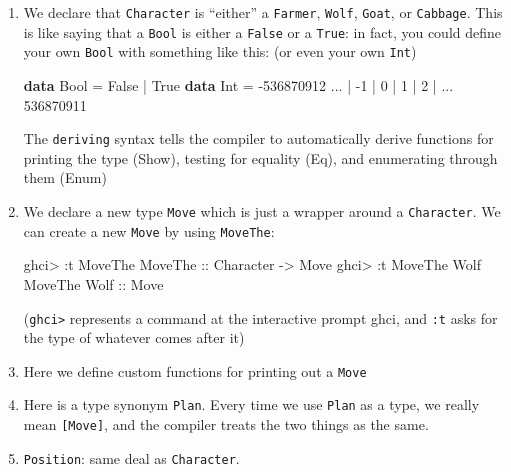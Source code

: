 \documentclass[]{article}
\newenvironment{Shaded}{}{}
\newcommand{\KeywordTok}[1]{\textcolor[rgb]{0.00,0.44,0.13}{\textbf{{#1}}}}
\newcommand{\DataTypeTok}[1]{\textcolor[rgb]{0.56,0.13,0.00}{{#1}}}
\newcommand{\DecValTok}[1]{\textcolor[rgb]{0.25,0.63,0.44}{{#1}}}
\newcommand{\OtherTok}[1]{\textcolor[rgb]{0.00,0.44,0.13}{{#1}}}
\newcommand{\FunctionTok}[1]{\textcolor[rgb]{0.02,0.16,0.49}{{#1}}}
\newcommand{\NormalTok}[1]{{#1}}
\begin{document}
\begin{enumerate}
\def\labelenumi{\arabic{enumi}.}
\item
  We declare that \texttt{Character} is ``either'' a \texttt{Farmer},
  \texttt{Wolf}, \texttt{Goat}, or \texttt{Cabbage}. This is like saying that a
  \texttt{Bool} is either a \texttt{False} or a \texttt{True}: in fact, you
  could define your own \texttt{Bool} with something like this: (or even your
  own \texttt{Int})

\begin{Shaded}
\begin{Highlighting}[]
\KeywordTok{data} \DataTypeTok{Bool} \FunctionTok{=} \DataTypeTok{False} \FunctionTok{|} \DataTypeTok{True}
\KeywordTok{data} \DataTypeTok{Int} \FunctionTok{=} \FunctionTok{-}\DecValTok{536870912} \FunctionTok{...} \FunctionTok{|} \FunctionTok{-}\DecValTok{1} \FunctionTok{|} \DecValTok{0} \FunctionTok{|} \DecValTok{1} \FunctionTok{|} \DecValTok{2} \FunctionTok{|} \FunctionTok{...} \DecValTok{536870911}
\end{Highlighting}
\end{Shaded}

  The \texttt{deriving} syntax tells the compiler to automatically derive
  functions for printing the type (Show), testing for equality (Eq), and
  enumerating through them (Enum)
\item
  We declare a new type \texttt{Move} which is just a wrapper around a
  \texttt{Character}. We can create a new \texttt{Move} by using
  \texttt{MoveThe}:

\begin{Shaded}
\begin{Highlighting}[]
\NormalTok{ghci}\FunctionTok{>} \FunctionTok{:}\NormalTok{t }\DataTypeTok{MoveThe}
\DataTypeTok{MoveThe}\OtherTok{ ::} \DataTypeTok{Character} \OtherTok{->} \DataTypeTok{Move}
\NormalTok{ghci}\FunctionTok{>} \FunctionTok{:}\NormalTok{t }\DataTypeTok{MoveThe} \DataTypeTok{Wolf}
\DataTypeTok{MoveThe} \DataTypeTok{Wolf}\OtherTok{ ::} \DataTypeTok{Move}
\end{Highlighting}
\end{Shaded}

  (\texttt{ghci\textgreater{}} represents a command at the interactive prompt
  ghci, and \texttt{:t} asks for the type of whatever comes after it)
\item
  Here we define custom functions for printing out a \texttt{Move}
\item
  Here is a type synonym \texttt{Plan}. Every time we use \texttt{Plan} as a
  type, we really mean \texttt{{[}Move{]}}, and the compiler treats the two
  things as the same.
\item
  \texttt{Position}: same deal as \texttt{Character}.
\end{enumerate}
\end{document}
